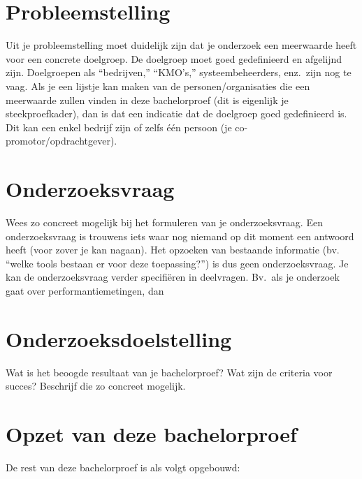 \section{Probleemstelling}
\label{sec:probleemstelling}

Uit je probleemstelling moet duidelijk zijn dat je onderzoek een meerwaarde heeft voor een concrete doelgroep. De doelgroep moet goed gedefinieerd en afgelijnd zijn. Doelgroepen als ``bedrijven,'' ``KMO's,'' systeembeheerders, enz.~zijn nog te vaag. Als je een lijstje kan maken van de personen/organisaties die een meerwaarde zullen vinden in deze bachelorproef (dit is eigenlijk je steekproefkader), dan is dat een indicatie dat de doelgroep goed gedefinieerd is. Dit kan een enkel bedrijf zijn of zelfs één persoon (je co-promotor/opdrachtgever).

\section{Onderzoeksvraag}
\label{sec:onderzoeksvraag}

Wees zo concreet mogelijk bij het formuleren van je onderzoeksvraag. Een onderzoeksvraag is trouwens iets waar nog niemand op dit moment een antwoord heeft (voor zover je kan nagaan). Het opzoeken van bestaande informatie (bv. ``welke tools bestaan er voor deze toepassing?'') is dus geen onderzoeksvraag. Je kan de onderzoeksvraag verder specifiëren in deelvragen. Bv.~als je onderzoek gaat over performantiemetingen, dan 

\section{Onderzoeksdoelstelling}
\label{sec:onderzoeksdoelstelling}

Wat is het beoogde resultaat van je bachelorproef? Wat zijn de criteria voor succes? Beschrijf die zo concreet mogelijk.

\section{Opzet van deze bachelorproef}
\label{sec:opzet-bachelorproef}


De rest van deze bachelorproef is als volgt opgebouwd:

